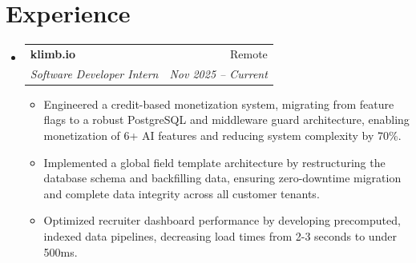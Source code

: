 \documentclass[letterpaper,10pt]{article}
\makeatletter
\newenvironment{resumeList}{
  \begin{itemize}[leftmargin=0.15in, label={}]
}{
  \end{itemize}
}
\newcommand{\resumeItem}[1]{
  \item\small{
    {#1 \vspace{-2.5pt}}
  }
}
\newcommand{\resumeSubheading}[4]{
  \vspace{-2pt}\item
    \begin{tabular*}{0.97\textwidth}[t]{l@{\extracolsep{\fill}}r}
      \textbf{#1} & #2 \\
      \textit{\small#3} & \textit{\small #4} \\
    \end{tabular*}\vspace{-6pt}
}
\newcommand{\resumeItemListStart}{\begin{itemize}[leftmargin=0.15in]}
\newcommand{\resumeItemListEnd}{\end{itemize}\vspace{-5pt}}
\makeatother
\begin{document}
\section{Experience}
\begin{resumeList}
    \resumeSubheading
    {klimb.io}{Remote}
    {Software Developer Intern}{Nov 2025 – Current}
  \resumeItemListStart
    \resumeItem{Engineered a credit-based monetization system, migrating from feature flags to a robust PostgreSQL and middleware guard architecture, enabling monetization of 6+ AI features and reducing system complexity by 70\%.}
    \resumeItem{Implemented a global field template architecture by restructuring the database schema and backfilling data, ensuring zero-downtime migration and complete data integrity across all customer tenants.}
    \resumeItem{Optimized recruiter dashboard performance by developing precomputed, indexed data pipelines, decreasing load times from 2-3 seconds to under 500ms.}
  \resumeItemListEnd
\end{resumeList}

\end{document}
